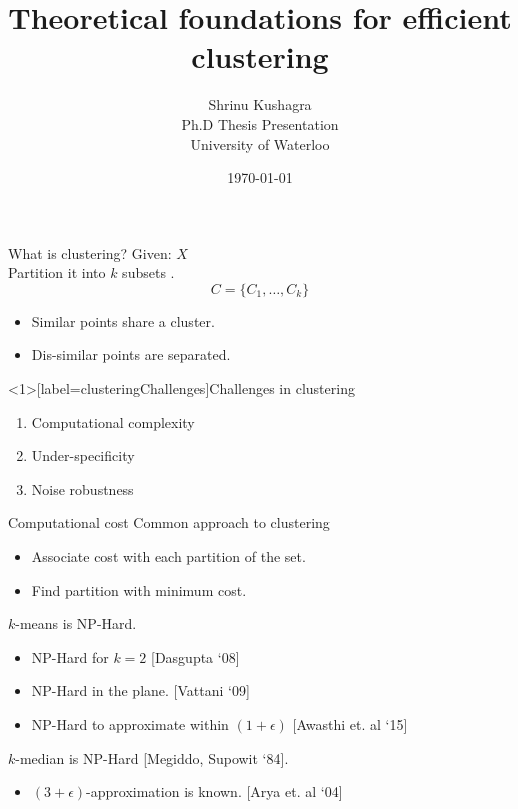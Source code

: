 \documentclass{beamer}
\title[Efficient Clustering]{Theoretical foundations for efficient clustering}
\author[S. Kushagra]{
Shrinu Kushagra\\
\vspace{30pt}Ph.D Thesis Presentation\\
University of Waterloo
}
\date{\today}
\begin{document}
\begin{frame}
  \titlepage
\end{frame}

\begin{frame}{What is clustering?}
	Given: $X$\\
	\vspace{10pt}Partition it into $k$ subsets .$$C = \{C_1, \ldots, C_k\}$$
	\begin{itemize}
		\item Similar points share a cluster.
		\item Dis-similar points are separated.
	\end{itemize}
\end{frame}

\begin{frame}<1>[label=clusteringChallenges]{Challenges in clustering}
	\begin{enumerate}
		 \item Computational complexity
		\onslide<2> \vspace{20pt}\item  Under-specificity
		\onslide<3>\vspace{20pt}\item Noise robustness
	\end{enumerate}
\end{frame}

\begin{frame}{Computational cost}
	Common approach to clustering
	\begin{itemize}
		\item Associate cost with each partition of the set.
		\item Find partition with minimum cost.
	\end{itemize}

	\vspace{20pt}$k$-means is NP-Hard.
	\begin{itemize}
		\item NP-Hard for $k=2$ \alert{[Dasgupta `08]}
		\vspace{0pt}\item NP-Hard in the plane. \alert{[Vattani `09]}
		\vspace{0pt}\item NP-Hard to approximate within $(1+\epsilon)$ \alert{[Awasthi et. al `15]}
	\end{itemize} 
	
	\vspace{20pt}$k$-median is NP-Hard \alert{[Megiddo, Supowit `84]}.
	\begin{itemize}
		\vspace{0pt}\item $(3+\epsilon)$-approximation is known. \alert{[Arya et. al `04]}
	\end{itemize}		
\end{frame}
\end{document}
